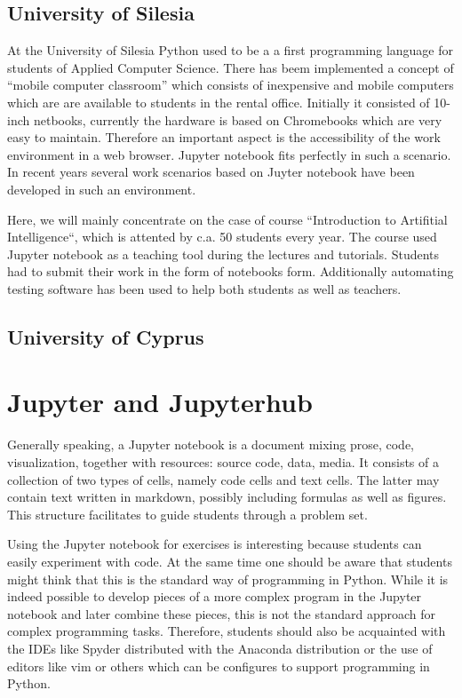 \documentclass[twocolumn]{svjour3}          %
\begin{document}
\subsection{University of Silesia}

At the University of Silesia Python used to be a a first programming
language for students of Applied Computer Science. There has beem
implemented a concept of ``mobile computer classroom'' which consists
of inexpensive and mobile computers which are are available to
students in the rental office. Initially it consisted of 10-inch
netbooks, currently the hardware is based on Chromebooks which are
very easy to maintain. Therefore an important aspect is the
accessibility of the work environment in a web browser. Jupyter
notebook fits perfectly in such a scenario. In recent years several
work scenarios based on Juyter notebook have been developed in such an
environment.

Here, we will mainly concentrate on the case of course ``Introduction
to Artifitial Intelligence``, which is attented by c.a. 50 students
every year. The course used Jupyter notebook as a teaching tool during
the lectures and tutorials. Students had to submit their work in the
form of notebooks form. Additionally automating testing software has been 
used to help both students as well as teachers.


\subsection{University of Cyprus}





\section{Jupyter and Jupyterhub}
\label{sec:jupyter_jupyterhub}

Generally speaking, a Jupyter notebook is a document mixing prose,
code, visualization, together with resources: source code, data,
media.  It consists of a collection of two types of cells, namely code
cells and text cells. The latter may contain text written in markdown,
possibly including formulas as well as figures. This structure
facilitates to guide students through a problem set.


Using the Jupyter notebook for exercises is interesting because students can
easily experiment with code. At the same time one should be aware that students
might think that this is the standard way of programming in Python. While it is
indeed possible to develop pieces of a more complex program in the Jupyter 
notebook and later combine these pieces, this is not the standard approach for
complex programming tasks. Therefore, students should also be acquainted with
the IDEs like Spyder distributed with the Anaconda distribution or the use of
editors like vim or others which can be configures to support programming in
Python.
\end{document}

